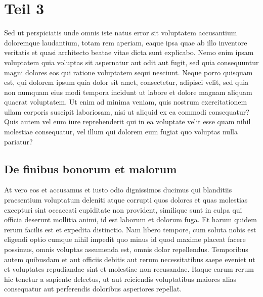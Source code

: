 %
%
%
%
\section{Teil 3
\label{circuit:section:teil3}}
Sed ut perspiciatis unde omnis iste natus error sit voluptatem
accusantium doloremque laudantium, totam rem aperiam, eaque ipsa
quae ab illo inventore veritatis et quasi architecto beatae vitae
dicta sunt explicabo. Nemo enim ipsam voluptatem quia voluptas sit
aspernatur aut odit aut fugit, sed quia consequuntur magni dolores
eos qui ratione voluptatem sequi nesciunt. Neque porro quisquam
est, qui dolorem ipsum quia dolor sit amet, consectetur, adipisci
velit, sed quia non numquam eius modi tempora incidunt ut labore
et dolore magnam aliquam quaerat voluptatem. Ut enim ad minima
veniam, quis nostrum exercitationem ullam corporis suscipit laboriosam,
nisi ut aliquid ex ea commodi consequatur? Quis autem vel eum iure
reprehenderit qui in ea voluptate velit esse quam nihil molestiae
consequatur, vel illum qui dolorem eum fugiat quo voluptas nulla
pariatur?

\subsection{De finibus bonorum et malorum
\label{circuit:subsection:malorum}}
At vero eos et accusamus et iusto odio dignissimos ducimus qui
blanditiis praesentium voluptatum deleniti atque corrupti quos
dolores et quas molestias excepturi sint occaecati cupiditate non
provident, similique sunt in culpa qui officia deserunt mollitia
animi, id est laborum et dolorum fuga. Et harum quidem rerum facilis
est et expedita distinctio. Nam libero tempore, cum soluta nobis
est eligendi optio cumque nihil impedit quo minus id quod maxime
placeat facere possimus, omnis voluptas assumenda est, omnis dolor
repellendus. Temporibus autem quibusdam et aut officiis debitis aut
rerum necessitatibus saepe eveniet ut et voluptates repudiandae
sint et molestiae non recusandae. Itaque earum rerum hic tenetur a
sapiente delectus, ut aut reiciendis voluptatibus maiores alias
consequatur aut perferendis doloribus asperiores repellat.


